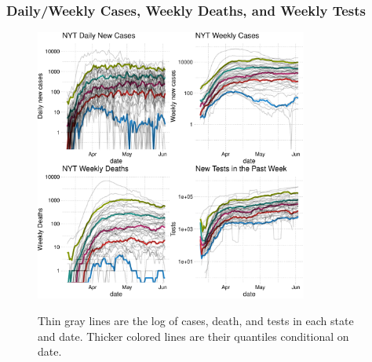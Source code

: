 \documentclass{beamer}
\begin{document}
\begin{frame}
  \frametitle{Daily/Weekly Cases,  Weekly Deaths, and Weekly Tests} 
  \begin{figure}
  \centering
  \begin{minipage}{\textwidth}
    \centering
    \includegraphics[width=0.8\textwidth,height=0.65\textwidth]{tables_and_figures/casesdeaths_q}
  \end{minipage}
     \begin{flushleft}
      \footnotesize Thin gray lines are the log of cases, death, and tests  in each
      state and date. Thicker colored lines are their quantiles conditional on date.
      \end{flushleft}
\end{figure}

\end{frame}


\end{document}
